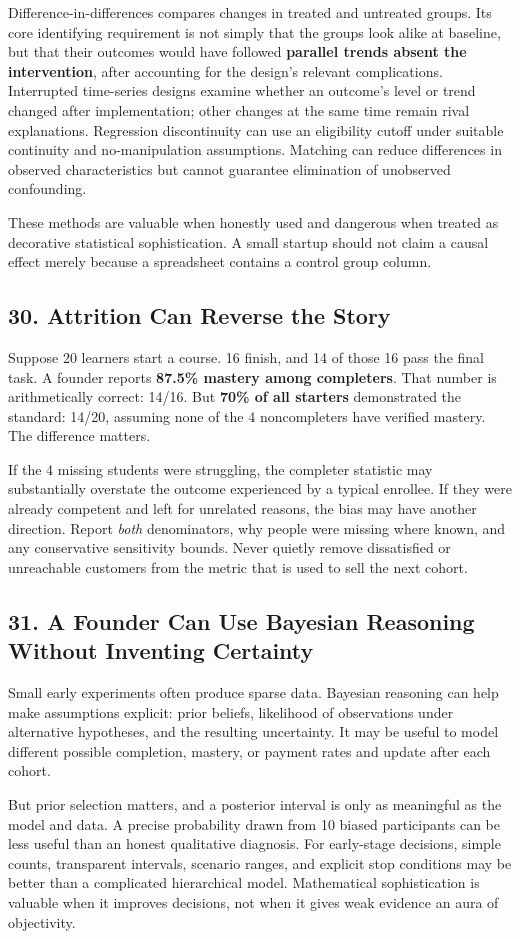 Difference-in-differences compares changes in treated and untreated groups. Its core identifying requirement is not simply that the groups look alike at baseline, but that their outcomes would have followed \textbf{parallel trends absent the intervention}, after accounting for the design's relevant complications. Interrupted time-series designs examine whether an outcome's level or trend changed after implementation; other changes at the same time remain rival explanations. Regression discontinuity can use an eligibility cutoff under suitable continuity and no-manipulation assumptions. Matching can reduce differences in observed characteristics but cannot guarantee elimination of unobserved confounding.

These methods are valuable when honestly used and dangerous when treated as decorative statistical sophistication. A small startup should not claim a causal effect merely because a spreadsheet contains a control group column.

\subsection*{30. Attrition Can Reverse the Story}

Suppose 20 learners start a course. 16 finish, and 14 of those 16 pass the final task. A founder reports \textbf{87.5\% mastery among completers}. That number is arithmetically correct: 14/16. But \textbf{70\% of all starters} demonstrated the standard: 14/20, assuming none of the 4 noncompleters have verified mastery. The difference matters.

If the 4 missing students were struggling, the completer statistic may substantially overstate the outcome experienced by a typical enrollee. If they were already competent and left for unrelated reasons, the bias may have another direction. Report \emph{both} denominators, why people were missing where known, and any conservative sensitivity bounds. Never quietly remove dissatisfied or unreachable customers from the metric that is used to sell the next cohort.

\subsection*{31. A Founder Can Use Bayesian Reasoning Without Inventing Certainty}

Small early experiments often produce sparse data. Bayesian reasoning can help make assumptions explicit: prior beliefs, likelihood of observations under alternative hypotheses, and the resulting uncertainty. It may be useful to model different possible completion, mastery, or payment rates and update after each cohort.

But prior selection matters, and a posterior interval is only as meaningful as the model and data. A precise probability drawn from 10 biased participants can be less useful than an honest qualitative diagnosis. For early-stage decisions, simple counts, transparent intervals, scenario ranges, and explicit stop conditions may be better than a complicated hierarchical model. Mathematical sophistication is valuable when it improves decisions, not when it gives weak evidence an aura of objectivity.
